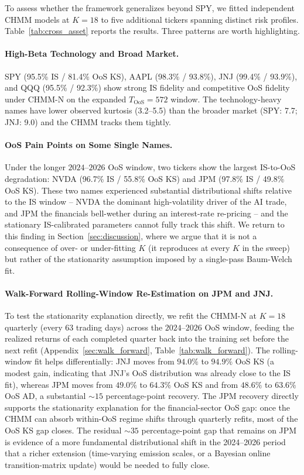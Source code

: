 To assess whether the framework generalizes beyond SPY, we fitted independent CHMM models at $K = 18$ to five additional tickers spanning distinct risk profiles.
Table~\ref{tab:cross_asset} reports the results.
Three patterns are worth highlighting.

\paragraph{High-Beta Technology and Broad Market.}
SPY (95.5\% IS / 81.4\% OoS KS), AAPL (98.3\% / 93.8\%), JNJ (99.4\% / 93.9\%), and QQQ (95.5\% / 92.3\%) show strong IS fidelity and competitive OoS fidelity under CHMM-N on the expanded $T_{\text{OoS}} = 572$ window.
The technology-heavy names have lower observed kurtosis (3.2--5.5) than the broader market (SPY: 7.7; JNJ: 9.0) and the CHMM tracks them tightly.

\paragraph{OoS Pain Points on Some Single Names.}
Under the longer $2024$--$2026$ OoS window, two tickers show the largest IS-to-OoS degradation: NVDA (96.7\% IS / 55.8\% OoS KS) and JPM (97.8\% IS / 49.8\% OoS KS).
These two names experienced substantial distributional shifts relative to the IS window -- NVDA the dominant high-volatility driver of the AI trade, and JPM the financials bell-wether during an interest-rate re-pricing -- and the stationary IS-calibrated parameters cannot fully track this shift.
We return to this finding in Section~\ref{sec:discussion}, where we argue that it is not a consequence of over- or under-fitting $K$ (it reproduces at every $K$ in the sweep) but rather of the stationarity assumption imposed by a single-pass Baum-Welch fit.

\paragraph{Walk-Forward Rolling-Window Re-Estimation on JPM and JNJ.}
To test the stationarity explanation directly, we refit the CHMM-N at $K = 18$ quarterly (every $63$ trading days) across the $2024$--$2026$ OoS window, feeding the realized returns of each completed quarter back into the training set before the next refit (Appendix~\ref{sec:walk_forward}, Table~\ref{tab:walk_forward}).
The rolling-window fit helps differentially: JNJ moves from $94.0\%$ to $94.9\%$ OoS KS (a modest gain, indicating that JNJ's OoS distribution was already close to the IS fit), whereas JPM moves from $49.0\%$ to $64.3\%$ OoS KS and from $48.6\%$ to $63.6\%$ OoS AD, a substantial $\sim 15$ percentage-point recovery.
The JPM recovery directly supports the stationarity explanation for the financial-sector OoS gap: once the CHMM can absorb within-OoS regime shifts through quarterly refits, most of the OoS KS gap closes.
The residual $\sim 35$ percentage-point gap that remains on JPM is evidence of a more fundamental distributional shift in the 2024--2026 period that a richer extension (time-varying emission scales, or a Bayesian online transition-matrix update) would be needed to fully close.

